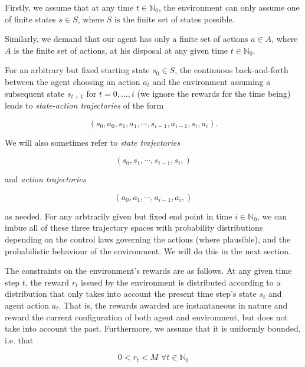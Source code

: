 \documentclass[11pt]{article} %
\begin{document}
Firstly, we assume that at any time $t \in \mathbb{N}_0$, the environment can only assume one of finite states $s \in S$, where $S$ is the finite set of states possible. 

Similarly, we demand that our agent has only a finite set of actions $a \in A$, where $A$ is the finite set of actions, at his disposal at any given time $t \in \mathbb{N}_0$.

For an arbitrary but fixed starting state $s_0 \in S$, the continuous back-and-forth between the agent choosing an action $a_t$ and the environment assuming a subsequent state $s_{t+1}$ for $t=0,\dots,i$ (we ignore the rewards for the time being) leads to \textit{state-action trajectories} of the form

\begin{equation}\label{stateActionTraj}
	(s_0, a_0, s_1, a_1, \cdots, s_{i-1},a_{i-1},s_i,a_i).
\end{equation}

We will also sometimes refer to \textit{state trajectories}

\begin{equation}\label{stateActionTraj}
	(s_0, s_1, \cdots, s_{i-1},s_i,)
\end{equation}

 and \textit{action trajectories}

\begin{equation}\label{actionTraj}
	(a_0, a_1, \cdots, a_{i-1},a_i,)
\end{equation}

as needed. For any arbtrarily given but fixed end point in time $i \in \mathbb{N}_0$, we can imbue all of these three trajectory spaces with probability distributions depending on the control laws governing the actions (where plausible), and the probabilistic behaviour of the environment. We will do this in the next section.

The constraints on the environment's rewards are as follows. At any given time step $t$, the reward $r_t$ issued by the environment is distributed according to a distribution that only takes into account the present time step's state $s_t$ and agent action $a_t$. That is, the rewards awarded are instantaneous in nature and reward the current configuration of both agent and environment, but does not take into account the past. Furthermore, we assume that it is uniformly bounded, i.e. that 

\begin{equation}
	0 < r_t < M \,\, \forall t \in \mathbb{N}_0
\end{equation}
\end{document}
